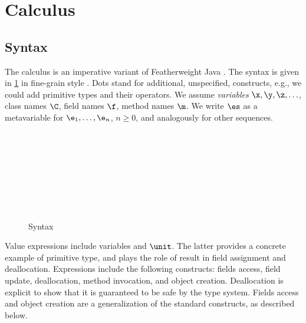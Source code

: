 
\section{Calculus}\label{sect:calculus}

\subsection{Syntax} 
The calculus is an imperative variant of Featherweight Java \cite{IgarashiPW99}. The syntax is given in \cref{fig:syntax} in fine-grain style \cite{LevyPT03}. Dots stand for additional, unspecified, constructs, e.g., we could add primitive types and their operators. 
We assume \emph{variables} $\x, \y, \z, \ldots$, class names $\C$, field names $\f$, method names $\m$. 
We write $\es$ as  a  metavariable for $\e_1, \ldots, \e_n$, $n\geq 0$, and analogously for other sequences. 
\begin{figure}
\begin{grammatica}
\\
\\
\\
\seguitoproduzione{\FieldUpdate{\bez\x\eez}{\f}{\ve}\mid\Free{\bez\x\eez}\mid\MethCall{\bez\x\eez}{\m}{\vs}}{}\\
\seguitoproduzione{\bez
\RecNew{\xs}{\ks}\eez}{}\\
\\
\produzione{\tau}{\C\mid\Unit\mid\ldots}{non-graded type}\\
\end{grammatica}
\caption{Syntax}\label{fig:syntax}
\end{figure}

Value expressions include variables and $\unit$. \bez The latter provides a concrete example of primitive type, and plays the role of result in field assignment and deallocation. \eez Expressions include the following constructs: fields access, field update, deallocation, method invocation, and object creation.  Deallocation is explicit to show  that it is guaranteed to be safe by the type system.  
\bez
Fields access and object creation are a generalization of the standard constructs, as described below.

